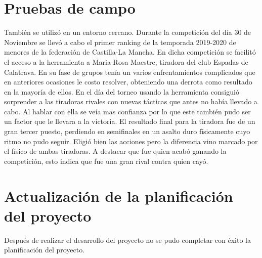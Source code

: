 \section{Pruebas de campo}
También se utilizó en un entorno cercano. Durante la competición del día 30 de Noviembre se llevó
a cabo el primer ranking de la temporada 2019-2020 de menores de la federación de Castilla-La Mancha.
En dicha competición se facilitó el acceso a la herramienta a Maria Rosa Maestre, tiradora del club
Espadas de Calatrava. En su fase de grupos tenía un varios enfrentamientos complicados que en anteriores
ocasiones le costo resolver, obteniendo una derrota como resultado en la mayoría de ellos. En el día
del torneo usando la herramienta consiguió sorprender a las tiradoras rivales con nuevas tácticas que
antes no había llevado a cabo. Al hablar con ella se veía mas confianza por lo que este también
pudo ser un factor que le llevara a la victoria. El resultado final para la tiradora fue de
un gran tercer puesto, perdiendo en semifinales en un asalto duro físicamente cuyo ritmo no pudo
seguir. Eligió bien las acciones pero la diferencia vino marcado por el físico de ambas tiradoras.
A destacar que fue quien acabó ganando la competición, esto indica que fue una gran rival contra
quien cayó.

\section{Actualización de la planificación del proyecto}
Después de realizar el desarrollo del proyecto no se pudo completar con éxito la planificación
del proyecto.


